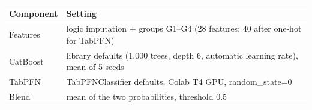 \begin{tabular}{ll}
\toprule
Component & Setting \\
\midrule
Features & logic imputation + groups G1–G4 (28 features; 40 after one-hot for TabPFN) \\
CatBoost & library defaults (1,000 trees, depth 6, automatic learning rate), mean of 5 seeds \\
TabPFN & TabPFNClassifier defaults, Colab T4 GPU, random_state=0 \\
Blend & mean of the two probabilities, threshold 0.5 \\
\bottomrule
\end{tabular}
